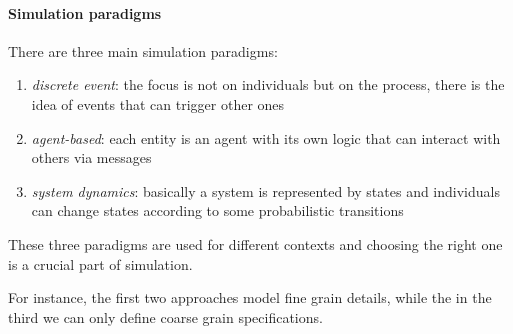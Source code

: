 \paragraph{Simulation paradigms}
There are three main simulation paradigms:
\begin{enumerate}
    \item \emph{discrete event}: the focus is not on individuals but on the process, 
    there is the idea of events that can trigger other ones  
    \item \emph{agent-based}: each entity is an agent with its own logic that can 
    interact with others via messages
    \item \emph{system dynamics}: basically a system is represented by states and 
    individuals can change states according to some probabilistic transitions
\end{enumerate}
These three paradigms are used for different contexts and choosing the right one 
is a crucial part of simulation. 

For instance, the first two approaches model fine grain details, 
while the in the third we can only define coarse grain specifications.